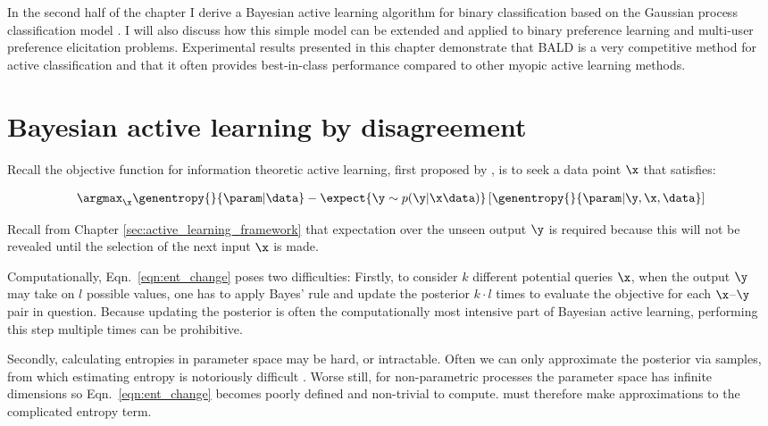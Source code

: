 In the second half of the chapter I derive a Bayesian active learning algorithm for binary classification based on the Gaussian process classification model \citep[Chapter 3]{Rasmussen2006}. I will also discuss how this simple model can be extended and applied to binary preference learning and multi-user preference elicitation problems. Experimental results presented in this chapter demonstrate that BALD is a very competitive method for active classification and that it often provides best-in-class performance compared to other myopic active learning methods.

\section{Bayesian active learning by disagreement}

Recall the objective function for information theoretic active learning, first proposed by \citet{lindley1956}, is to seek a data point $\x$ that satisfies:

\begin{align}	
	\label{eqn:ent_change}
	\argmax_{\x} \genentropy{}{\param | \data} - \expect{\y\sim p(\y|\x\data)} \left[ \genentropy{}{\param| \y, \x,\data} \right] 
\end{align}

Recall from Chapter \ref{sec:active_learning_framework} that expectation over the unseen output $\y$ is required because this will not be revealed until the selection of the next input $\x$ is made.

Computationally, Eqn.\ \eqref{eqn:ent_change} poses two difficulties: Firstly, to consider $k$ different potential queries $\x$, when the output $\y$ may take on $l$ possible values, one has to apply Bayes' rule and update the posterior $k\cdot l$ times to evaluate the objective for each $\x$--$\y$ pair in question. Because updating the posterior is often the computationally most intensive part of Bayesian active learning, performing this step multiple times can be prohibitive.

Secondly, calculating entropies in parameter space may be hard, or intractable. Often we can only approximate the posterior via samples, from which estimating entropy is notoriously difficult \citep{panzeri2007}. Worse still, for non-parametric processes the parameter space has infinite dimensions so Eqn.\ \eqref{eqn:ent_change} becomes poorly defined and non-trivial to compute. \citep{MacKay1992, Krishnapuram2004, Lawrence2004} must therefore make approximations to the complicated entropy term.

